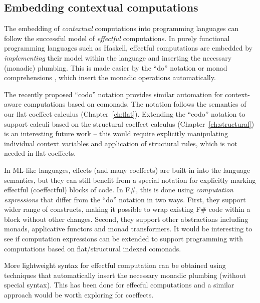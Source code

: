 
\subsection{Embedding contextual computations}
\label{sec:unified-impl-embed}

The embedding of \emph{contextual} computations into programming languages can follow the successful
model of \emph{effectful} computations. In purely functional programming languages such as Haskell, 
effectful computations are embedded by \emph{implementing} their model within the language 
and inserting the necessary (monadic) plumbing. This is made easier by the ``do'' notation or
monad comprehensions \cite{other-haskell98,monads-compre}, which insert the monadic operations 
automatically.

The recently proposed ``codo'' notation \cite{comonads-codo} provides similar automation for
context-aware computations based on comonads. The notation follows the semantics of our 
flat coeffect calculus (Chapter~\ref{ch:flat}). Extending the ``codo'' notation to support calculi based 
on the structural coeffect calculus (Chapter~\ref{ch:structural}) is an interesting future work -- 
this would require explicitly manipulating individual context variables and application of structural
rules, which is not needed in flat coeffects.

In ML-like languages, effects (and many coeffects) are built-in into the language semantics, 
but they can still benefit from a special notation for explicitly marking effectful (coeffectful) 
blocks of code. In F\#, this is done using \emph{computation expressions}  \cite{app-computation-zoo}
that differ from the ``do'' notation in two ways. First, they support wider range of 
constructs, making it possible to wrap existing F\# code within a block without other changes.
Second, they support other abstractions including monads, applicative functors and monad
transformers. It would be interesting to see if computation expressions can be extended to
support programming with computations based on flat/structural indexed comonads.

More lightweight syntax for effectful computation can be obtained using
techniques that automatically insert the necessary monadic plumbing (without
special syntax). This has been done for effecful computations \cite{monads-lightweight-ml}
and a similar approach would be worth exploring for coeffects. 

